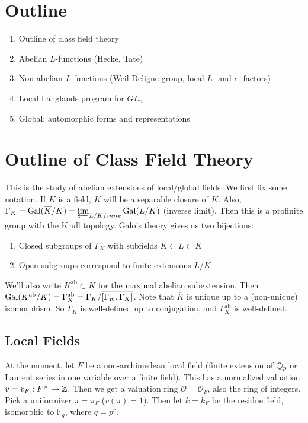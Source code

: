 
\section{Outline}
\begin{enumerate}[(1)]
\item Outline of class field theory
\item Abelian $L$-functions (Hecke, Tate)
\item Non-abelian $L$-functions (Weil-Deligne group, local $L$- and $\epsilon$-
                                 factors)
\item Local Langlands program for $GL_n$
\item Global: automorphic forms and representations
\end{enumerate}


\section{Outline of Class Field Theory}

This is the study of abelian extensions of local/global fields. We first fix
some notation. If $K$ is a field, $\overline{K}$ will be a separable closure of
$K$. Also, $\Gamma_K = \mathrm{Gal}{(\overline{K} / K)} = \varprojlim_{L/K finite} \mathrm{Gal}{(L / K)}$
(inverse limit).
Then this is a profinite group with the Krull topology. Galois theory gives us
two bijections:
\begin{enumerate}[(1)]
\item Closed subgroups of $\Gamma_K$ with subfields $K \subset L \subset
\overline{K}$
\item Open subgroups correspond to finite extensions $L/K$
\end{enumerate}

We'll also write $K^{\operatorname{ab}} \subset \overline{K}$ for the maximal
abelian subextension. Then $\mathrm{Gal}{(K^{\operatorname{ab}} / K)} =
\Gamma_K^{\operatorname{ab}} = \Gamma_K/\overline{[\Gamma_K, \Gamma_K]}$.
Note that $\overline{K}$ is unique up to a (non-unique) isomorphism. So
$\Gamma_K$ is well-defined up to conjugation, and $\Gamma_K^{\operatorname{ab}}$
is well-defined.

\subsection{Local Fields} At the moment, let $F$ be a non-archimedean local
field (finite extension of $\mathbb{Q}_p$ or Laurent series in one variable over a finite
field). This has a normalized valuation $v = v_F : F^\times \rightarrow \mathbb{Z}$.
Then we get a valuation ring $\mathcal{O} = \mathcal{O}_F$, also the ring of
integers. Pick a uniformizer $\pi = \pi_F$ ($v(\pi) = 1$). Then let $k = k_F$ be
the residue field, isomorphic to $\mathbb{F}_q$, where $q = p^r$. 

